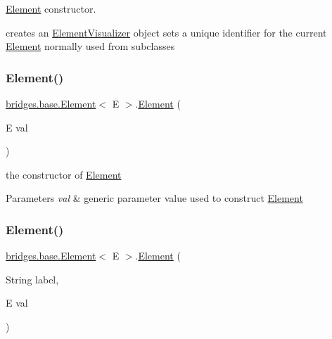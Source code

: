 \hyperlink{classbridges_1_1base_1_1_element}{Element} constructor. 

creates an \hyperlink{classbridges_1_1base_1_1_element_visualizer}{Element\+Visualizer} object sets a unique identifier for the current \hyperlink{classbridges_1_1base_1_1_element}{Element} normally used from subclasses \mbox{\label{classbridges_1_1base_1_1_element_a6cb9b3b85b923602aad5c1be6696d825}} 
\subsubsection{\texorpdfstring{Element()}{Element()}\hspace{0.1cm}{\footnotesize\ttfamily [2/4]}}
{\footnotesize\ttfamily \hyperlink{classbridges_1_1base_1_1_element}{bridges.\+base.\+Element}$<$ E $>$.\hyperlink{classbridges_1_1base_1_1_element}{Element} (\begin{DoxyParamCaption}\item[{E}]{val }\end{DoxyParamCaption})}



the constructor of \hyperlink{classbridges_1_1base_1_1_element}{Element} 


\begin{DoxyParams}{Parameters}
{\em val} & generic parameter value used to construct \hyperlink{classbridges_1_1base_1_1_element}{Element} \\
\hline
\end{DoxyParams}
\mbox{\label{classbridges_1_1base_1_1_element_a14e857e8050eac518900a458f0364d8e}} 
\subsubsection{\texorpdfstring{Element()}{Element()}\hspace{0.1cm}{\footnotesize\ttfamily [3/4]}}
{\footnotesize\ttfamily \hyperlink{classbridges_1_1base_1_1_element}{bridges.\+base.\+Element}$<$ E $>$.\hyperlink{classbridges_1_1base_1_1_element}{Element} (\begin{DoxyParamCaption}\item[{String}]{label,  }\item[{E}]{val }\end{DoxyParamCaption})}



